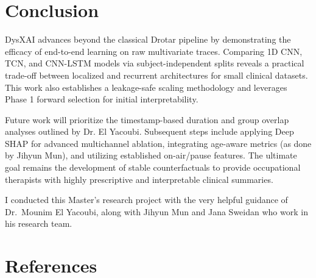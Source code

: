 \documentclass{article}
\begin{document}
\section{Conclusion}
\label{sec:conclusion}

DysXAI advances beyond the classical Drotar pipeline by demonstrating the efficacy of end-to-end learning on raw multivariate traces. Comparing 1D CNN, TCN, and CNN-LSTM models via subject-independent splits reveals a practical trade-off between localized and recurrent architectures for small clinical datasets. This work also establishes a leakage-safe scaling methodology and leverages Phase 1 forward selection for initial interpretability.

Future work will prioritize the timestamp-based duration and group overlap analyses outlined by Dr. El Yacoubi. Subsequent steps include applying Deep SHAP for advanced multichannel ablation, integrating age-aware metrics (as done by Jihyun Mun), and utilizing established on-air/pause features. The ultimate goal remains the development of stable counterfactuals to provide occupational therapists with highly prescriptive and interpretable clinical summaries.

\begin{ack}
  I conducted this Master's research project with the very helpful guidance of Dr.\ Mounim El Yacoubi, along with Jihyun Mun and Jana Sweidan who work in his research team. 
  
\end{ack}

\section*{References}
\end{document}
